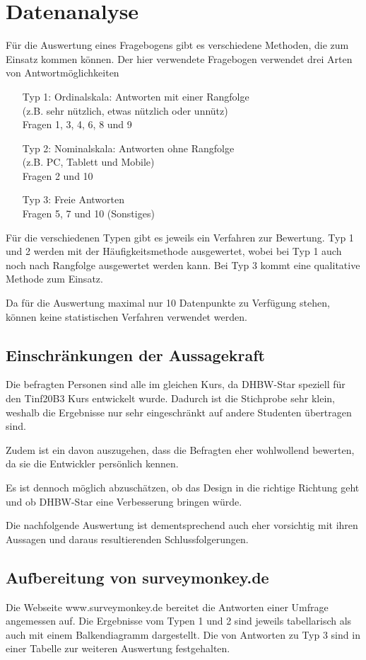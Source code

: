 \chapter{Datenanalyse}
Für die Auswertung eines Fragebogens gibt es verschiedene Methoden, die zum Einsatz kommen können. Der hier verwendete Fragebogen verwendet drei Arten von Antwortmöglichkeiten
\begin{itemize}
	\item[Typ 1:] {Ordinalskala: Antworten mit einer Rangfolge \\
		(z.B. sehr nützlich, etwas nützlich oder unnütz) \\
		Fragen 1, 3, 4, 6, 8 und 9}
	\item[Typ 2:] {Nominalskala: Antworten ohne Rangfolge \\
		(z.B. PC, Tablett und Mobile) \\
		Fragen 2 und 10}
	\item[Typ 3:] {Freie Antworten \\
		Fragen 5, 7 und 10 (Sonstiges) }
\end{itemize}
Für die verschiedenen Typen gibt es jeweils ein Verfahren zur Bewertung.
Typ 1 und 2 werden mit der Häufigkeitsmethode ausgewertet, wobei bei Typ 1 auch noch nach Rangfolge ausgewertet werden kann. Bei Typ 3 kommt eine qualitative Methode zum Einsatz.

Da für die Auswertung maximal nur 10 Datenpunkte zu Verfügung stehen, können keine statistischen Verfahren verwendet werden.

\section{Einschränkungen der Aussagekraft }
Die befragten Personen sind alle im gleichen Kurs, da DHBW-Star speziell für den Tinf20B3 Kurs entwickelt wurde. Dadurch ist die Stichprobe sehr klein, weshalb die Ergebnisse nur sehr eingeschränkt auf andere Studenten übertragen sind.


Zudem ist ein davon auszugehen, dass die Befragten eher wohlwollend bewerten, da sie die Entwickler persönlich kennen.

Es ist dennoch möglich abzuschätzen, ob das Design in die richtige Richtung geht und ob DHBW-Star eine Verbesserung bringen würde.

Die nachfolgende Auswertung ist dementsprechend auch eher vorsichtig mit ihren Aussagen und daraus resultierenden Schlussfolgerungen.

\section{Aufbereitung von surveymonkey.de}
Die Webseite www.surveymonkey.de bereitet die Antworten einer Umfrage angemessen auf. Die Ergebnisse vom Typen 1 und 2 sind jeweils tabellarisch als auch mit einem Balkendiagramm dargestellt.
Die von Antworten zu Typ 3 sind in einer Tabelle zur weiteren Auswertung festgehalten.

